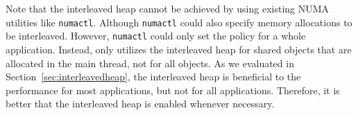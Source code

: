  
Note that the interleaved heap cannot be achieved by using existing NUMA utilities like \texttt{numactl}. Although \texttt{numactl} could also specify memory allocations to be interleaved. However, \texttt{numactl} could only set the policy for a whole application. Instead, \NM{} only utilizes the interleaved heap for shared objects that are allocated in the main thread, not for all objects. As we evaluated in Section~\ref{sec:interleavedheap}, the interleaved heap is beneficial to the performance for most applications, but not for all applications. Therefore, it is better that the interleaved heap is enabled whenever necessary. 




